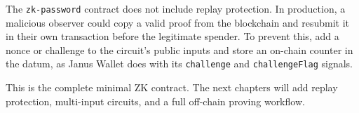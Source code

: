 \begin{remark}
The \texttt{zk-password} contract does not include replay protection. In
production, a malicious observer could copy a valid proof from the blockchain
and resubmit it in their own transaction before the legitimate spender. To
prevent this, add a nonce or challenge to the circuit's public inputs and
store an on-chain counter in the datum, as Janus Wallet does with its
\texttt{challenge} and \texttt{challengeFlag} signals.
\end{remark}

This is the complete minimal ZK contract. The next chapters will add replay
protection, multi-input circuits, and a full off-chain proving workflow.
